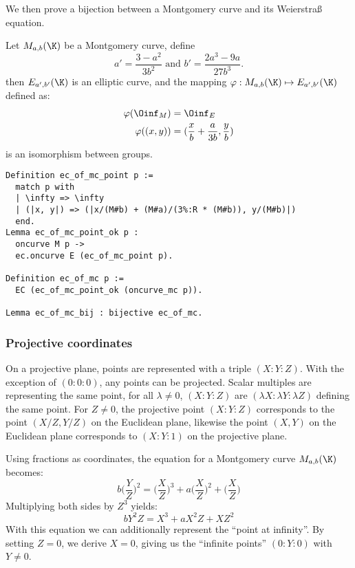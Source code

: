 We then prove a bijection between a Montgomery curve and its Weierstra{\ss} equation.
\begin{lemma}
  Let $M_{a,b}(\K)$ be a Montgomery curve, define
  $$a' = \frac{3-a^2}{3b^2} \text{\ \ \ \ and\ \ \ \ } b' = \frac{2a^3 - 9a}{27b^3}.$$
  then $E_{a',b'}(\K)$ is an elliptic curve, and the mapping
  $\varphi : M_{a,b}(\K) \mapsto E_{a',b'}(\K)$ defined as:
  \begin{align*}
    \varphi(\Oinf_M) &= \Oinf_E\\
    \varphi( (x , y) ) &= ( \frac{x}{b} + \frac{a}{3b} , \frac{y}{b} )
  \end{align*}
  is an isomorphism between groups.
\end{lemma}
\begin{lstlisting}[language=Coq]
Definition ec_of_mc_point p :=
  match p with
  | \infty => \infty
  | (|x, y|) => (|x/(M#b) + (M#a)/(3%:R * (M#b)), y/(M#b)|)
  end.
Lemma ec_of_mc_point_ok p :
  oncurve M p ->
  ec.oncurve E (ec_of_mc_point p).

Definition ec_of_mc p :=
  EC (ec_of_mc_point_ok (oncurve_mc p)).

Lemma ec_of_mc_bij : bijective ec_of_mc.
\end{lstlisting}


\subsubsection{Projective coordinates}
\label{subsec:ECC-projective}

On a projective plane, points are represented with a triple $(X:Y:Z)$.
With the exception of $(0:0:0)$, any points can be projected.
Scalar multiples are representing the same point, \ie
for all $\lambda \neq 0$, $(X:Y:Z)$ are $(\lambda X:\lambda Y:\lambda Z)$ defining
the same point.
For $Z\neq 0$, the projective point $(X:Y:Z)$ corresponds to the
point $(X/Z,Y/Z)$ on the Euclidean plane, likewise the point $(X,Y)$ on the
Euclidean plane corresponds to $(X:Y:1)$ on the projective plane.

Using fractions as coordinates, the equation for a Montgomery curve $M_{a,b}(\K)$
becomes:
$$b \bigg(\frac{Y}{Z}\bigg)^2 = \bigg(\frac{X}{Z}\bigg)^3 + a \bigg(\frac{X}{Z}\bigg)^2 + \bigg(\frac{X}{Z}\bigg)$$
Multiplying both sides by $Z^3$ yields:
$$b Y^2Z = X^3 + a X^2Z + XZ^2$$
With this equation we can additionally represent the ``point at infinity''. By
setting $Z=0$, we derive $X=0$, giving us the ``infinite points'' $(0:Y:0)$ with $Y\neq 0$.

